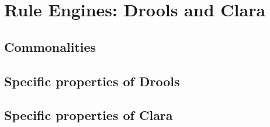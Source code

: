 \section{Rule Engines: Drools and Clara}


\subsection{Commonalities}

\subsection{Specific properties of Drools}


\subsection{Specific properties of Clara}



